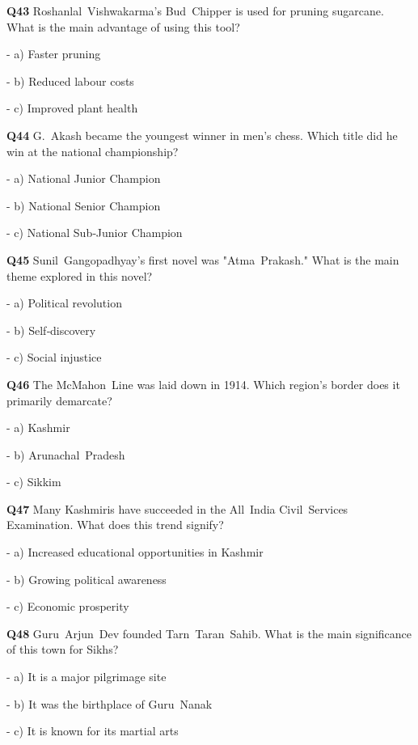\textbf{Q43} Roshanlal Vishwakarma's Bud Chipper is used for pruning sugarcane. What is the main advantage of using this tool?\par
\quad - a) Faster pruning\par
\quad - b) Reduced labour costs\par
\quad - c) Improved plant health\par

\textbf{Q44} G. Akash became the youngest winner in men's chess. Which title did he win at the national championship?\par
\quad - a) National Junior Champion\par
\quad - b) National Senior Champion\par
\quad - c) National Sub‑Junior Champion\par

\textbf{Q45} Sunil Gangopadhyay's first novel was "Atma Prakash." What is the main theme explored in this novel?\par
\quad - a) Political revolution\par
\quad - b) Self‑discovery\par
\quad - c) Social injustice\par

\textbf{Q46} The McMahon Line was laid down in 1914. Which region's border does it primarily demarcate?\par
\quad - a) Kashmir\par
\quad - b) Arunachal Pradesh\par
\quad - c) Sikkim\par

\textbf{Q47} Many Kashmiris have succeeded in the All India Civil Services Examination. What does this trend signify?\par
\quad - a) Increased educational opportunities in Kashmir\par
\quad - b) Growing political awareness\par
\quad - c) Economic prosperity\par

\textbf{Q48} Guru Arjun Dev founded Tarn Taran Sahib. What is the main significance of this town for Sikhs?\par
\quad - a) It is a major pilgrimage site\par
\quad - b) It was the birthplace of Guru Nanak\par
\quad - c) It is known for its martial arts\par

